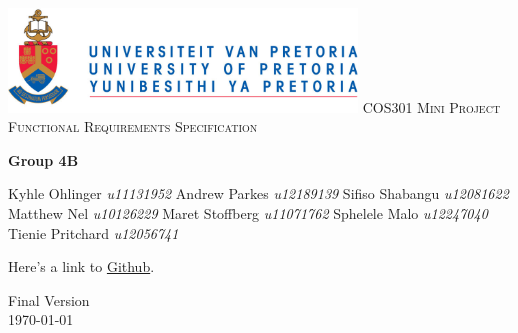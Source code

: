 \begin{titlepage}
\begin{center}
\includegraphics[width=350px]{University_of_Pretoria_Logo.PNG}\newline
\textsc{\LARGE COS301 Mini Project Functional Requirements Specification}\newline


\textbf{Group 4B} \\
\begin{flushright} \large
Kyhle Ohlinger \emph{u11131952} \newline
Andrew Parkes \emph{u12189139} \newline
Sifiso Shabangu \emph{u12081622} \newline
Matthew Nel \emph{u10126229} \newline
Maret Stoffberg \emph{u11071762} \newline
Sphelele Malo \emph{u12247040} \newline
Tienie Pritchard \emph{u12056741} \newline \newline \newline
\end{flushright}
Here's a link to \href{https://github.com/KyhleOhlinger/COS301-Group-4_B.git}{Github}.


\vfill

{\large Final Version}
\\
{\large \today}

\end{center}
\end{titlepage}
